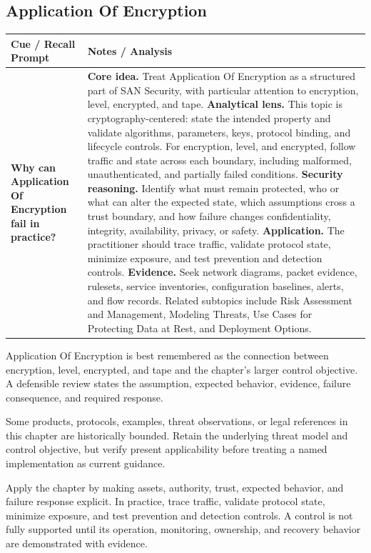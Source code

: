 \documentclass[11pt]{article}
\newcommand{\CornellHeader}{%
\rowcolor{Navy}\color{white}\bfseries Cue / Recall Prompt & \color{white}\bfseries Notes / Analysis\\\hline}
\newcommand{\CornellRow}[2]{%
\cellcolor{CueGray}\RaggedRight\textbf{#1} & \RaggedRight #2\\\hline}
\begin{document}
\subsection*{Application Of Encryption}
\begin{longtable}{>{\RaggedRight\arraybackslash}p{}|>{\RaggedRight\arraybackslash}p{}}
\CornellHeader
\CornellRow{Why can Application Of Encryption fail in practice?}{\textbf{Core idea.} Treat Application Of Encryption as a structured part of SAN Security, with particular attention to encryption, level, encrypted, and tape. \textbf{Analytical lens.} This topic is cryptography-centered: state the intended property and validate algorithms, parameters, keys, protocol binding, and lifecycle controls. For encryption, level, and encrypted, follow traffic and state across each boundary, including malformed, unauthenticated, and partially failed conditions. \textbf{Security reasoning.} Identify what must remain protected, who or what can alter the expected state, which assumptions cross a trust boundary, and how failure changes confidentiality, integrity, availability, privacy, or safety. \textbf{Application.} The practitioner should trace traffic, validate protocol state, minimize exposure, and test prevention and detection controls. \textbf{Evidence.} Seek network diagrams, packet evidence, rulesets, service inventories, configuration baselines, alerts, and flow records. Related subtopics include Risk Assessment and Management, Modeling Threats, Use Cases for Protecting Data at Rest, and Deployment Options.}
\end{longtable}
\begin{topicsummary}
Application Of Encryption is best remembered as the connection between encryption, level, encrypted, and tape and the chapter's larger control objective. A defensible review states the assumption, expected behavior, evidence, failure consequence, and required response.
\end{topicsummary}
\begin{historybox}
Some products, protocols, examples, threat observations, or legal references in this chapter are historically bounded. Retain the underlying threat model and control objective, but verify present applicability before treating a named implementation as current guidance.
\end{historybox}
\begin{defensebox}
Apply the chapter by making assets, authority, trust, expected behavior, and failure response explicit. In practice, trace traffic, validate protocol state, minimize exposure, and test prevention and detection controls. A control is not fully supported until its operation, monitoring, ownership, and recovery behavior are demonstrated with evidence.
\end{defensebox}
\end{document}
